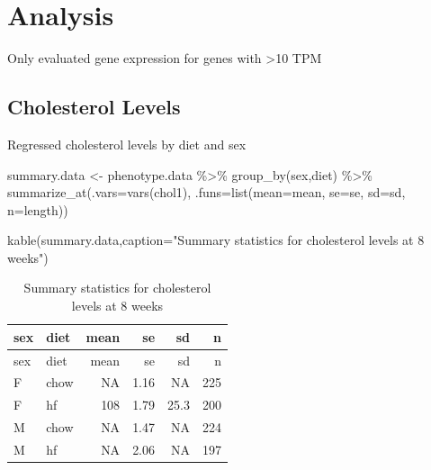 \documentclass[
]{article}
\newenvironment{Shaded}{\begin{snugshade}}{\end{snugshade}}
\newcommand{\AttributeTok}[1]{\textcolor[rgb]{0.77,0.63,0.00}{#1}}
\newcommand{\FunctionTok}[1]{\textcolor[rgb]{0.00,0.00,0.00}{#1}}
\newcommand{\NormalTok}[1]{#1}
\newcommand{\OtherTok}[1]{\textcolor[rgb]{0.56,0.35,0.01}{#1}}
\newcommand{\SpecialCharTok}[1]{\textcolor[rgb]{0.00,0.00,0.00}{#1}}
\newcommand{\StringTok}[1]{\textcolor[rgb]{0.31,0.60,0.02}{#1}}
\begin{document}
\hypertarget{analysis}{%
\section{Analysis}\label{analysis}}

Only evaluated gene expression for genes with \textgreater10 TPM

\hypertarget{cholesterol-levels}{%
\subsection{Cholesterol Levels}\label{cholesterol-levels}}

Regressed cholesterol levels by diet and sex

\begin{Shaded}
\begin{Highlighting}[]
\NormalTok{summary.data }\OtherTok{\textless{}{-}}
\NormalTok{  phenotype.data }\SpecialCharTok{\%\textgreater{}\%}
  \FunctionTok{group\_by}\NormalTok{(sex,diet) }\SpecialCharTok{\%\textgreater{}\%}
  \FunctionTok{summarize\_at}\NormalTok{(}\AttributeTok{.vars=}\FunctionTok{vars}\NormalTok{(chol1), }\AttributeTok{.funs=}\FunctionTok{list}\NormalTok{(}\AttributeTok{mean=}\NormalTok{mean,}
                                             \AttributeTok{se=}\NormalTok{se,}
                                             \AttributeTok{sd=}\NormalTok{sd,}
                                             \AttributeTok{n=}\NormalTok{length))}

\FunctionTok{kable}\NormalTok{(summary.data,}\AttributeTok{caption=}\StringTok{"Summary statistics for cholesterol levels at 8 weeks"}\NormalTok{)}
\end{Highlighting}
\end{Shaded}

\begin{longtable}[]{@{}llrrrr@{}}
\caption{Summary statistics for cholesterol levels at 8
weeks}\tabularnewline
\toprule()
sex & diet & mean & se & sd & n \\
\midrule()
\endfirsthead
\toprule()
sex & diet & mean & se & sd & n \\
\midrule()
\endhead
F & chow & NA & 1.16 & NA & 225 \\
F & hf & 108 & 1.79 & 25.3 & 200 \\
M & chow & NA & 1.47 & NA & 224 \\
M & hf & NA & 2.06 & NA & 197 \\
\bottomrule()
\end{longtable}
\end{document}
